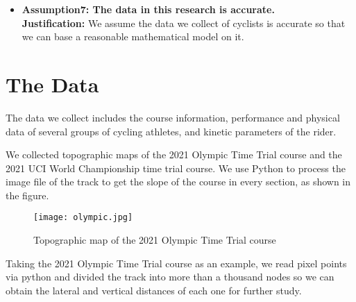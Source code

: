 \documentclass{mcmthesis}
\begin{document}
\begin{itemize}
	\item {\bf Assumption7: The data in this research is accurate.} \\
	{\bf Justification:} We assume the data we collect of cyclists is accurate so that we can base a reasonable mathematical model on it.
	
\end{itemize}






\section{The Data}

The data we collect includes the course information, performance and physical data of several groups of cycling athletes, and kinetic parameters of the rider. %

We collected topographic maps of the 2021 Olympic Time Trial course and the 2021 UCI World Championship time trial course. We use Python to process the image file of the track to get the slope of the course in every section, as shown in the figure.
\begin{figure}[h]
	\centering
	\texttt{[image: olympic.jpg]}
	\caption{Topographic map of the  2021 Olympic Time Trial course} 
\end{figure}
Taking the 2021 Olympic Time Trial course as an example, we read pixel points via python and divided the track into more than a thousand nodes so we can obtain the lateral and vertical distances of each one for further study.
\end{document}
